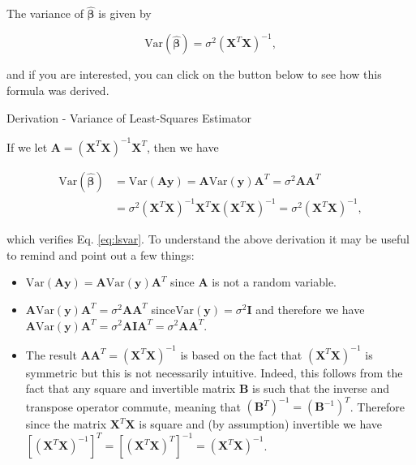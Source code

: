 \documentclass[12pt,]{krantz}
\providecommand{\tightlist}{%
  \setlength{\itemsep}{0pt}\setlength{\parskip}{0pt}}
\let\BeginKnitrBlock\begin \let\EndKnitrBlock\end
\begin{document}
\newline

The variance of \(\hat{\boldsymbol{\beta}}\) is given by

\begin{equation}
\text{Var} \left(\hat{\boldsymbol{\beta}} \right) = \sigma^2 \left(\mathbf{X}^T \mathbf{X}\right)^{-1},
\label{eq:lsvar}
\end{equation}

and if you are interested, you can click on the button below to see how
this formula was derived.

Derivation - Variance of Least-Squares Estimator

\hypertarget{hideclass2}{}
\BeginKnitrBlock{rmdtip}
If we let
\(\mathbf{A} = \left(\mathbf{X}^T \mathbf{X}\right)^{-1} \mathbf{X}^T\),
then we have

\begin{equation*}
\begin{aligned}
  \text{Var} \left(\hat{\boldsymbol{\beta}} \right) &= \text{Var} \left( \mathbf{A} \mathbf{y} \right) = \mathbf{A} \text{Var} \left(  \mathbf{y} \right) \mathbf{A}^T = \sigma^2 \mathbf{A} \mathbf{A}^T \\
  & = \sigma^2 \left(\mathbf{X}^T \mathbf{X}\right)^{-1} \mathbf{X}^T  \mathbf{X} \left(\mathbf{X}^T \mathbf{X}\right)^{-1} = \sigma^2 \left(\mathbf{X}^T \mathbf{X}\right)^{-1},
\end{aligned}
\end{equation*}

which verifies Eq. \eqref{eq:lsvar}. To understand the above derivation it
may be useful to remind and point out a few things:

\begin{itemize}
\tightlist
\item
  \(\text{Var} \left( \mathbf{A} \mathbf{y} \right) = \mathbf{A} \text{Var} \left( \mathbf{y} \right) \mathbf{A}^T\)
  since \(\mathbf{A}\) is not a random variable.
\item
  \(\mathbf{A} \text{Var} \left( \mathbf{y} \right) \mathbf{A}^T = \sigma^2 \mathbf{A} \mathbf{A}^T\)
  since\(\text{Var} \left( \mathbf{y} \right) = \sigma^2 \mathbf{I}\)
  and therefore we have
  \(\mathbf{A} \text{Var} \left( \mathbf{y} \right) \mathbf{A}^T = \sigma^2 \mathbf{A} \mathbf{I} \mathbf{A}^T = \sigma^2 \mathbf{A} \mathbf{A}^T\).
\item
  The result
  \(\mathbf{A} \mathbf{A}^T = (\mathbf{X}^T \mathbf{X})^{-1}\) is based
  on the fact that \((\mathbf{X}^T \mathbf{X})^{-1}\) is symmetric but
  this is not necessarily intuitive. Indeed, this follows from the fact
  that any square and invertible matrix \(\mathbf{B}\) is such that the
  inverse and transpose operator commute, meaning that
  \(( \mathbf{B}^T )^{-1} = ( \mathbf{B}^{-1} )^T\). Therefore since the
  matrix \(\mathbf{X}^T \mathbf{X}\) is square and (by assumption)
  invertible we have
  \([(\mathbf{X}^T \mathbf{X})^{-1}]^T = [(\mathbf{X}^T \mathbf{X})^{T}]^{-1} = ( \mathbf{X}^T \mathbf{X})^{-1}\).\\
\end{itemize}
\EndKnitrBlock{rmdtip}
\end{document}
